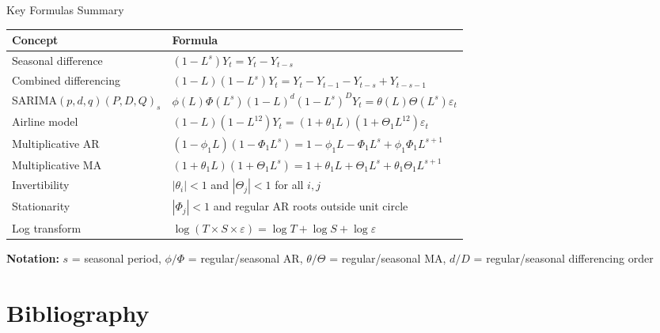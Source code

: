 \documentclass[9pt, aspectratio=169, t]{beamer}
\begin{document}
\begin{frame}{Key Formulas Summary}
    \begin{cminipage}{0.95\textwidth}
    \small
    \begin{center}
    \begin{tabular}{ll}
        \toprule
        \textbf{Concept} & \textbf{Formula} \\
        \midrule
        Seasonal difference & $(1-L^s)Y_t = Y_t - Y_{t-s}$ \\[0.1cm]
        Combined differencing & $(1-L)(1-L^s)Y_t = Y_t - Y_{t-1} - Y_{t-s} + Y_{t-s-1}$ \\[0.1cm]
        SARIMA$(p,d,q)(P,D,Q)_s$ & $\phi(L)\Phi(L^s)(1-L)^d(1-L^s)^D Y_t = \theta(L)\Theta(L^s)\varepsilon_t$ \\[0.1cm]
        Airline model & $(1-L)(1-L^{12})Y_t = (1+\theta_1 L)(1+\Theta_1 L^{12})\varepsilon_t$ \\[0.1cm]
        \midrule
        Multiplicative AR & $(1-\phi_1 L)(1-\Phi_1 L^s) = 1 - \phi_1 L - \Phi_1 L^s + \phi_1\Phi_1 L^{s+1}$ \\[0.1cm]
        Multiplicative MA & $(1+\theta_1 L)(1+\Theta_1 L^s) = 1 + \theta_1 L + \Theta_1 L^s + \theta_1\Theta_1 L^{s+1}$ \\[0.1cm]
        \midrule
        Invertibility & $|\theta_i| < 1$ and $|\Theta_j| < 1$ for all $i,j$ \\[0.1cm]
        Stationarity & $|\Phi_j| < 1$ and regular AR roots outside unit circle \\[0.1cm]
        \midrule
        Log transform & $\log(T \times S \times \varepsilon) = \log T + \log S + \log \varepsilon$ \\
        \bottomrule
    \end{tabular}
    \end{center}

    {\scriptsize \textbf{Notation:} $s$ = seasonal period, $\phi/\Phi$ = regular/seasonal AR, $\theta/\Theta$ = regular/seasonal MA, $d/D$ = regular/seasonal differencing order}
    \end{cminipage}
\end{frame}

\section{Bibliography}
\end{document}
